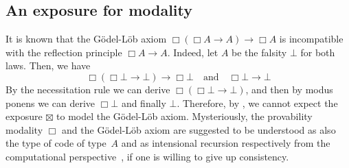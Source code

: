 \documentclass[a4paper,UKenglish,numberwithinsect,cleveref,thm-restate]{lipics-v2021}
\numberwithin{equation}{section}
\theoremstyle{definition}
\theoremstyle{plain}
\begin{document}
%

\subsection{An exposure for \texorpdfstring{\GL}{GL} modality}
It is known that the Gödel-Löb axiom $\Box(\Box A \to A) \to \Box A$ is incompatible with the reflection principle $\Box A \to A$.
Indeed, let $A$ be the falsity $\bot$ for both laws. Then, we have
\[
  \Box(\Box \bot \to \bot) \to \Box \bot
  \quad\text{and}\quad
  \Box \bot \to \bot
\]
By the necessitation rule we can derive $\Box (\Box \bot \to \bot)$, and then by modus ponens we can derive $\Box \bot$ and finally $\bot$.
Therefore, by , we cannot expect the exposure $\boxtimes$ to model the Gödel-Löb axiom.
Mysteriously, the provability modality $\Box$ and the Gödel-Löb axiom are suggested to be understood as also the type of code of type~$A$ and as intensional recursion respectively from the computational perspective~\cite{Kavvos2017b}, if one is willing to give up consistency.
\end{document}
